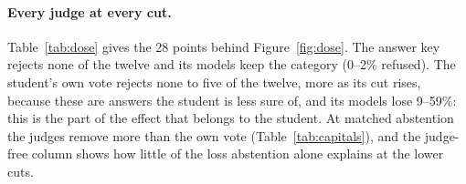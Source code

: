 \begin{table}[t]
\small
\centering
{}
\caption{The former-state blind spot at each operating point: refusal gap (former minus present-day) of the judge's models beyond models trained with the key plus random rejections at matched abstention. Two to six runs per cell.}
\label{tab:ladder}
\end{table}

\paragraph{Every judge at every cut.} Table~\ref{tab:dose} gives the 28 points behind Figure~\ref{fig:dose}. The answer key rejects none of the twelve and its models keep the category (0--2\% refused). The student's own vote rejects none to five of the twelve, more as its cut rises, because these are answers the student is less sure of, and its models lose 9--59\%: this is the part of the effect that belongs to the student. At matched abstention the judges remove more than the own vote (Table~\ref{tab:capitals}), and the judge-free column shows how little of the loss abstention alone explains at the lower cuts.


